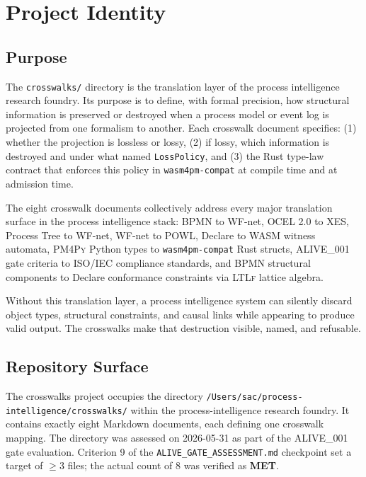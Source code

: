 
\section{Project Identity}
\label{sec:crosswalks-identity}

\subsection{Purpose}
\label{sec:crosswalks-identity-purpose}

The \texttt{crosswalks/} directory is the translation layer of the process intelligence research
foundry. Its purpose is to define, with formal precision, how structural information is preserved
or destroyed when a process model or event log is projected from one formalism to another. Each
crosswalk document specifies: (1) whether the projection is lossless or lossy, (2) if lossy, which
information is destroyed and under what named \texttt{LossPolicy}, and (3) the Rust type-law
contract that enforces this policy in \texttt{wasm4pm-compat} at compile time and at admission time.

The eight crosswalk documents collectively address every major translation surface in the process
intelligence stack: \textsc{BPMN} to WF-net, \textsc{OCEL} 2.0 to \textsc{XES}, Process Tree to
WF-net, WF-net to \textsc{POWL}, Declare to \textsc{WASM} witness automata, \textsc{PM4Py} Python
types to \texttt{wasm4pm-compat} Rust structs, \textsc{ALIVE\_001} gate criteria to
\textsc{ISO/IEC} compliance standards, and \textsc{BPMN} structural components to Declare
conformance constraints via \textsc{LTLf} lattice algebra.

Without this translation layer, a process intelligence system can silently discard object types,
structural constraints, and causal links while appearing to produce valid output. The crosswalks
make that destruction visible, named, and refusable.

\subsection{Repository Surface}
\label{sec:crosswalks-identity-surface}

The crosswalks project occupies the directory \texttt{/Users/sac/process-intelligence/crosswalks/}
within the process-intelligence research foundry. It contains exactly eight Markdown documents,
each defining one crosswalk mapping. The directory was assessed on 2026-05-31 as part of the
\textsc{ALIVE\_001} gate evaluation. Criterion 9 of the \texttt{ALIVE\_GATE\_ASSESSMENT.md}
checkpoint set a target of $\geq 3$ files; the actual count of 8 was verified as \textbf{MET}.


